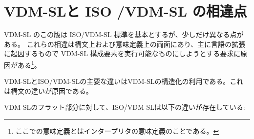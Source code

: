 \documentclass[\pformat,12pt]{jarticle}
\newcommand{\vdmslpp}[2]{%
#1
}
\newcommand{\vdmsl}{VDM-SL}
\newcommand{\vdmpp}{VDM++}
\begin{document}
\section{VDM-SLと ISO /VDM-SL の相違点}\label{diff}

  \vdmslpp{\vdmsl}{\vdmpp} のこの版は ISO/VDM-SL 標準を基本とするが、少しだけ異なる点がある。
これらの相違は構文上および意味定義上の両面にあり、主に言語の拡張に起因するもので\vdmslpp{\vdmsl}{\vdmpp}構成要素を実行可能なものにしようとする要求に原因がある\footnote{ここでの意味定義とはインタープリタの意味定義のことである。}。

{\vdmsl}とISO/VDM-SLの主要な違いはVDM-SLの構造化の利用である。これは構文の違いが原因である。

VDM-SLのフラット部分に対して、ISO/VDM-SLは以下の違いが存在している:
\end{document}
